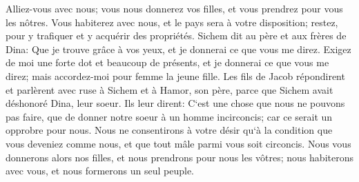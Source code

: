 \verse Alliez-vous avec nous; vous nous donnerez vos filles, et vous prendrez pour vous les nôtres. 
\verse Vous habiterez avec nous, et le pays sera à votre disposition; restez, pour y trafiquer et y acquérir des propriétés. 
\verse Sichem dit au père et aux frères de Dina: Que je trouve grâce à vos yeux, et je donnerai ce que vous me direz. 
\verse Exigez de moi une forte dot et beaucoup de présents, et je donnerai ce que vous me direz; mais accordez-moi pour femme la jeune fille. 
\verse Les fils de Jacob répondirent et parlèrent avec ruse à Sichem et à Hamor, son père, parce que Sichem avait déshonoré Dina, leur soeur. 
\verse Ils leur dirent: C`est une chose que nous ne pouvons pas faire, que de donner notre soeur à un homme incirconcis; car ce serait un opprobre pour nous. 
\verse Nous ne consentirons à votre désir qu`à la condition que vous deveniez comme nous, et que tout mâle parmi vous soit circoncis. 
\verse Nous vous donnerons alors nos filles, et nous prendrons pour nous les vôtres; nous habiterons avec vous, et nous formerons un seul peuple. 
